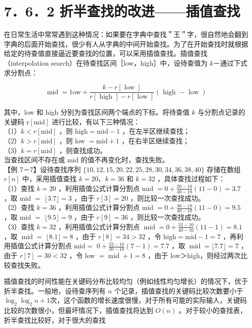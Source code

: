 \documentclass[10pt]{article}
\begin{document}
\section*{7．6．2 折半查找的改进——插值查找}
在日常生活中常常遇到这种情况：如果要在字典中查找＂王＂字，很自然地会翻到字典的后面开始查找，很少有人从字典的中间开始查找。为了在开始查找时就根据给定的待查值直接逼近要查找的位置，可以采用插值查找。插值查找（interpolation search）在待查找区间［low，high］中，设待查值为 $k$－通过下式求分割点：


\begin{equation*}
\operatorname{mid}=1 \mathrm{ow}+\frac{k-r[\text { low }]}{r[\text { high }]-r[\text { low }]}(\text { high }- \text { low }) \tag{7-7}
\end{equation*}


其中，low 和 high 分别为查找区间两个端点的下标。将待查值 $k$ 与分割点记录的关键码 $\mathrm{r}[\mathrm{mid}]$ 进行比较，有以下三种情况：\\
（1）$k<r[\mathrm{mid}]$ ，则 $\mathrm{high}=\mathrm{mid}-1$ ，在左半区继续查找；\\
（2）$k>r[\mathrm{mid}]$ ，则 low $=\mathrm{mid}+1$ ，在右半区继续查找；\\
（3）$k=r[\mathrm{mid}]$ ，则查找成功。\\
当查找区间不存在或 mid 的值不再变化时，查找失败。\\
【例 7－7】设待查找序列 $\{10,12,15,20,22,25,28,30,34,36,38,40\}$ 存储在数组 $r[n]$ 中，采用插值查找 $k=20 、 k=36$ 和 $k=32$ ，具体查找过程如下：\\
（1）查找 $k=20$ ，利用插值公式计算分割点 mid $=0+\frac{20-10}{40-10}(11-0)=3.7$ ，取 mid $=$ $\lfloor 3.7\rfloor=3$ ，由于 $r[3]=20$ ，则比较一次查找成功。\\
（2）查找 $k=36$ ，利用插值公式计算分割点 mid $=0+\frac{36-10}{40-10}(11-0)=9.5$ ，取 mid $=$ $\lfloor 9.5\rfloor=9$ ，由于 $r[9]=36$ ，则比较一次查找成功。\\
（3）查找 $k=32$ ，利用插值公式计算分割点 $\operatorname{mid}=0+\frac{32-10}{40-10}(11-1)=8.1$ ，取 $\operatorname{mid}=$ $\lfloor 8.1\rfloor=8$ ，由于 $r[8]=34>32$ ，令 $\mathrm{high}=\mathrm{mid}-1=7$ ，再利用插值公式计算分割点 $\mathrm{mid}=$ $0+\frac{32-10}{30-10}(7-1)=7.7$ ，取 $\operatorname{mid}=\lfloor 7.7\rfloor=7$ ，由于 $r[7]=30<32$ ，令 low $=\operatorname{mid}+1=8$ ，由于 low＞high，则经过两次比较查找失败。

插值查找的时间性能在关键码分布比较均匀（例如线性均匀增长）的情况下，优于折半查找。一般地，设待查序列有 $n$ 个记录，插值查找的关键码比较次数要小于 $\log _{2} \log _{2} n+1$次，这个函数的增长速度很慢，对于所有可能的实际输人，关键码比较的次数很小，但最坏情况下，插值查找将达到 $O(n)$ 。对于较小的查找表，折半查找比较好，对于很大的查找
\end{document}
